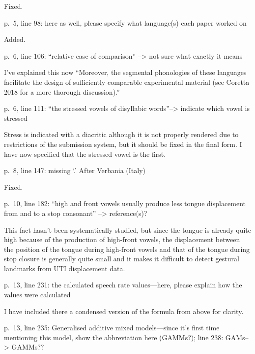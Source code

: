 \documentclass[]{article}
\begin{document}
Fixed. \color{black}

p.~5, line 98: here as well, please specify what language(s) each paper
worked on

\color{plum}

Added. \color{black}

p.~6, line 106: ``relative ease of comparison'' --\textgreater{} not
sure what exactly it means

\color{plum}

I've explained this now ``Moreover, the segmental phonologies of these
languages facilitate the design of sufficiently comparable experimental
material (see Coretta 2018 for a more thorough discussion).''
\color{black}

p.~6, line 111: ``the stressed vowels of disyllabic
words''--\textgreater{} indicate which vowel is stressed

\color{plum}

Stress is indicated with a diacritic although it is not properly
rendered due to restrictions of the submission system, but it should be
fixed in the final form. I have now specified that the stressed vowel is
the first. \color{black}

p.~8, line 147: missing `.' After Verbania (Italy)

\color{plum}

Fixed. \color{black}

p.~10, line 182: ``high and front vowels usually produce less tongue
displacement from and to a stop consonant'' --\textgreater{}
reference(s)?

\color{plum}

This fact hasn't been systematically studied, but since the tongue is
already quite high because of the production of high-front vowels, the
displacement between the position of the tongue during high-front vowels
and that of the tongue during stop closure is generally quite small and
it makes it difficult to detect gestural landmarks from UTI displacement
data. \color{black}

p.~13, line 231: the calculated speech rate values---here, please
explain how the values were calculated

\color{plum}

I have included there a condensed version of the formula from above for
clarity. \color{black}

p.~13, line 235: Generalised additive mixed models---since it's first
time mentioning this model, show the abbreviation here (GAMMs?); line
238: GAMs--\textgreater{} GAMMs??
\end{document}
